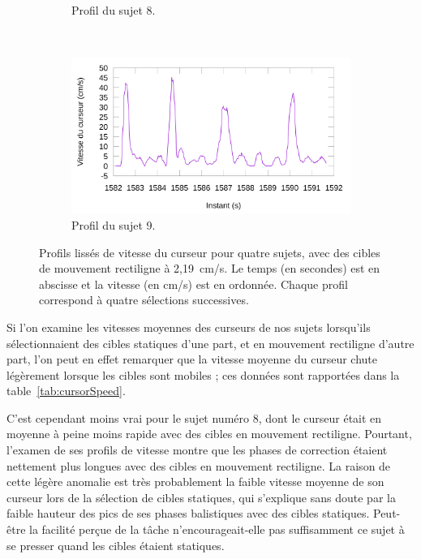 \begin{figure}[!htb]
\begin{subfigure}[t]{\subImgWlineplot}
			\caption{Profil du sujet 8.}
			\label{fig:rectProfile8}
		\end{subfigure}
		~
		\begin{subfigure}[t]{\subImgWlineplot}
			\centering
			\includegraphics[width=\textwidth]{figures/ch4/subject_09_rect_219_smoothed}
			\caption{Profil du sujet 9.}
			\label{fig:rectProfile9}
		\end{subfigure}
		\caption[Profils de vitesse du curseur, cibles de mouvement rectiligne]{Profils lissés de vitesse du curseur pour quatre sujets, avec des cibles de mouvement rectiligne à 2,19~cm/s. Le temps (en secondes) est en abscisse et la vitesse (en cm/s) est en ordonnée. Chaque profil correspond à quatre sélections successives.}
		\label{fig:rectProfiles}
	\end{figure}
	
	Si l'on examine les vitesses moyennes des curseurs de nos sujets lorsqu'ils sélectionnaient des cibles statiques d'une part, et en mouvement rectiligne d'autre part, l'on peut en effet remarquer que la vitesse moyenne du curseur chute légèrement lorsque les cibles sont mobiles ; ces données sont rapportées dans la table~\ref{tab:cursorSpeed}.
	
	C'est cependant moins vrai pour le sujet numéro 8, dont le curseur était en moyenne à peine moins rapide avec des cibles en mouvement rectiligne. Pourtant, l'examen de ses profils de vitesse montre que les phases de correction étaient nettement plus longues avec des cibles en mouvement rectiligne. La raison de cette légère anomalie est très probablement la faible vitesse moyenne de son curseur lors de la sélection de cibles statiques, qui s'explique sans doute par la faible hauteur des \og pics \fg{} de ses phases balistiques avec des cibles statiques. Peut-être la facilité perçue de la tâche n'encourageait-elle pas suffisamment ce sujet à se presser quand les cibles étaient statiques.
	
